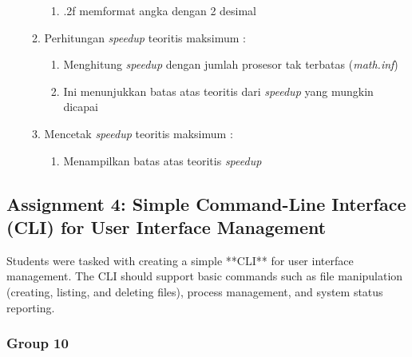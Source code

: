 \documentclass[12pt]{article}
\begin{document}
\begin{enumerate}
\begin{enumerate}
\begin{enumerate}
            \item .2f memformat angka dengan 2 desimal
        \end{enumerate}
    \item  Perhitungan \textit{speedup} teoritis maksimum :
        \begin{enumerate}
            \item Menghitung \textit{speedup} dengan jumlah prosesor tak terbatas (\textit{math.inf})
            \item Ini menunjukkan batas atas teoritis dari \textit{speedup} yang mungkin dicapai
        \end{enumerate}
    \item Mencetak \textit{speedup} teoritis maksimum :
        \begin{enumerate}
            \item Menampilkan batas atas teoritis \textit{speedup}
        \end{enumerate}


\end{enumerate}

\end{enumerate}

\subsection{Assignment 4: Simple Command-Line Interface (CLI) for User Interface Management}
Students were tasked with creating a simple **CLI** for user interface management. The CLI should support basic commands such as file manipulation (creating, listing, and deleting files), process management, and system status reporting.

\subsubsection{Group 10}
\end{document}
